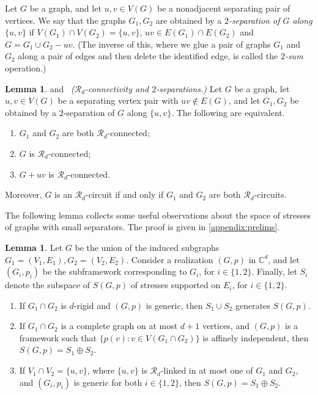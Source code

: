\documentclass[11pt,a4paper,dvipsnames]{scrartcl}
\theoremstyle{definition}
\newtheorem{lemma}[theorem]{Lemma}
\newcommand{\CC}{\mathbb{C}}
\newcommand{\rig}[1]{$#1$-rigid}
\begin{document}
Let $G$ be a graph, and let $u,v \in V(G)$ be a nonadjacent separating pair of vertices. We say that the graphs $G_1,G_2$ are obtained by a \emph{$2$-separation of $G$ along $\{u,v\}$} if $V(G_1) \cap V(G_2) = \{u,v\}$, $uv \in E(G_1) \cap E(G_2)$ and $G = G_1 \cup G_2 - uv$. (The inverse of this, where we glue a pair of graphs $G_1$ and $G_2$ along a pair of edges and then delete the identified edge, is called the \emph{$2$-sum} operation.) 

\begin{lemma}\label{lemma:mconnected2sum}\cite[Lemma 4.9]{garamvolgyi.jordan_2023} and~\cite[Lemma 10]{grasegger.etal_2022} 
    \emph{($\mathcal{R}_d$-connectivity and $2$-separations.)}\newline
    Let $G$ be a graph, let $u,v \in V(G)$ be a separating vertex pair with $uv \notin E(G)$, and let $G_1,G_2$ be obtained by a $2$-separation of $G$ along $\{u,v\}$. The following are equivalent.
    \begin{enumerate}
        \item $G_1$ and $G_2$ are both $\mathcal{R}_d$-connected;
        \item $G$ is $\mathcal{R}_d$-connected;
        \item $G+uv$ is $\mathcal{R}_d$-connected.
    \end{enumerate}
    Moreover, $G$ is an $\mathcal{R}_d$-circuit if and only if $G_1$ and $G_2$ are both $\mathcal{R}_d$-circuits.
\end{lemma}


The following lemma collects some useful observations about the space of stresses of graphs with small separators. The proof is given in \cref{appendix:prelims}.

\begin{lemma}\label{lemma:ksum}
    Let $G$ be the union of the induced subgraphs $G_1 = (V_1,E_1), G_2 = (V_2,E_2)$. Consider a realization $(G,p)$ in $\CC^d$, and let $(G_i,p_i)$ be the subframework corresponding to $G_i$, for $i \in \{1,2\}$. Finally, let $S_i$ denote the subspace of $S(G,p)$ of stresses supported on $E_i$, for $i \in \{1,2\}$.
    \begin{enumerate}
        \item If $G_1 \cap G_2$ is \rig{d} and $(G,p)$ is generic, then $S_1 \cup S_2$ generates $S(G,p)$.
        \item If $G_1 \cap G_2$ is a complete graph on at most $d+1$ vertices, and $(G,p)$ is a framework such that $\{p(v) : v \in V(G_1 \cap G_2)\}$ is affinely independent, then $S(G,p) = S_1 \oplus S_2$.
        \item If $V_1 \cap V_2 = \{u,v\}$, where $\{u,v\}$ is $\mathcal{R}_d$-linked in at most one of $G_1$ and $G_2$, and $(G_i,p_i)$ is generic for both $i \in \{1,2\}$, then $S(G,p) = S_1 \oplus S_2$.
    \end{enumerate}
\end{lemma}
\end{document}
